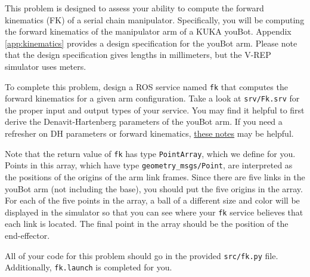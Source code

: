 This problem is designed to assess your ability to compute the forward kinematics (FK) of a serial
chain manipulator. Specifically, you will be computing the forward kinematics of the manipulator arm
of a KUKA youBot. Appendix \ref{app:kinematics} provides a design specification for the youBot arm.
Please note that the design specification gives lengths in millimeters, but the V-REP simulator uses
meters.

To complete this problem, design a ROS service named \texttt{fk} that computes the forward
kinematics for a given arm configuration. Take a look at \texttt{srv/Fk.srv} for the proper
input and output types of your service. You may find it helpful to first derive the
Denavit-Hartenberg parameters of the youBot arm. If you need a refresher on DH parameters or forward
kinematics, \href{https://rpal.cs.cornell.edu/foundations/kinematics.pdf#subsection.3.7}{these
notes} may be helpful.

Note that the return value of \texttt{fk} has type \texttt{PointArray}, which we define for you. Points in this array, which have type \texttt{geometry\_msgs/Point}, are interpreted as the positions of the origins of the arm link frames. Since there are five links in the youBot arm (not including the base), you should put the five origins in the array. For each of the five points in the array, a ball of a different size and color will be displayed in the simulator so that you can see where your \texttt{fk} service believes that each link is located. The final point in the array should be the position of the end-effector.

All of your code for this problem should go in the provided \texttt{src/fk.py} file.
Additionally, \texttt{fk.launch} is completed for you.

